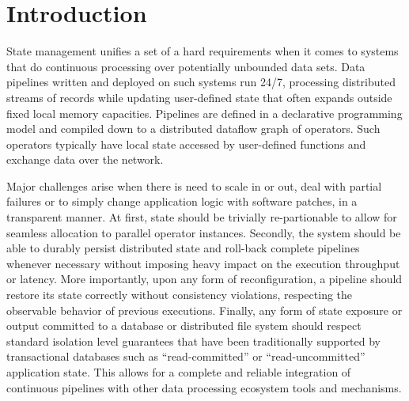 
\section{Introduction}



State management unifies a set of a hard requirements when it comes to systems that do continuous processing over potentially unbounded data sets. Data pipelines written and deployed on such systems run 24/7, processing distributed streams of records while updating user-defined state that often expands outside fixed local memory capacities. Pipelines are defined in a declarative programming model and compiled down to a distributed dataflow graph of operators. Such operators typically have local state accessed by user-defined functions and exchange data over the network.

Major challenges arise when there is need to scale in or out, deal with partial failures or to simply change application logic with software patches, in a transparent manner. At first, state should be trivially re-partionable to allow for seamless allocation to parallel operator instances. Secondly, the system should be able to durably persist distributed state and roll-back complete pipelines whenever necessary without imposing heavy impact on the execution throughput or latency. More importantly, upon any form of reconfiguration, a pipeline should restore its state correctly without consistency violations, respecting the observable behavior of previous executions. Finally, any form of state exposure or output committed to a database or distributed file system should respect standard isolation level guarantees that have been traditionally supported by transactional databases such as ``read-committed'' or ``read-uncommitted'' application state. This allows for a complete and reliable integration of continuous pipelines with other data processing ecosystem tools and mechanisms.


